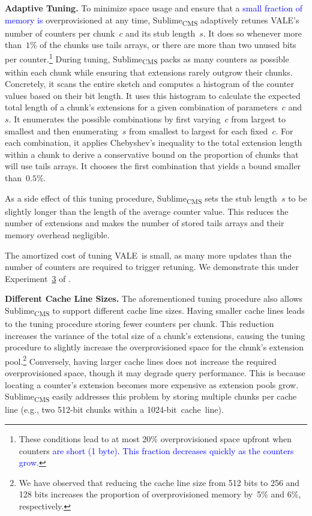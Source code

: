 \documentclass[sigconf]{acmart}
\newcommand{\sketch}{Sublime}
\newcommand{\sketchcms}{\sketch\textsubscript{CMS}\xspace}
\newcommand{\counterencodingabbrv}{VALE}
\begin{document}
\textbf{Adaptive Tuning.}
To minimize space usage and ensure that a \textcolor{blue}{small fraction of
memory is} overprovisioned at any time, \sketchcms adaptively retunes
\counterencodingabbrv's number of counters per chunk~$c$ and its stub
length~$s$. It does so whenever more than~$1\%$ of the chunks use tails arrays,
or there are more than two unused bits per counter.\footnote{These conditions
lead to at most 20\% overprovisioned space upfront when counters
\textcolor{blue}{are short (1 byte). This fraction decreases quickly as the
counters grow.}} During tuning, \sketchcms packs as many counters as possible
within each chunk while ensuring that extensions rarely outgrow their chunks.
Concretely, it scans the entire sketch and computes a histogram of the counter
values based on their bit length. It uses this histogram to calculate the
expected total length of a chunk's extensions for a given combination of
parameters~$c$ and $s$. It enumerates the possible combinations by first
varying~$c$ from largest to smallest and then enumerating~$s$ from smallest to
largest for each fixed~$c$. For each combination, it applies Chebyshev's
inequality to the total extension length within a chunk to derive a
conservative bound on the proportion of chunks that will use tails arrays. It
chooses the first combination that yields a bound smaller than~$0.5\%$. 

As a side effect of this tuning procedure, \sketchcms sets the stub length~$s$
to be slightly longer than the length of the average counter value. This
reduces the number of extensions and makes the number of stored tails arrays
and their memory overhead negligible.

The amortized cost of tuning \counterencodingabbrv\ is small, as many more
updates than the number of counters are required to trigger retuning. We
demonstrate this under Experiment~\hyperlink{experiment:vale_tuning}{3} of
.

\textbf{Different Cache Line Sizes.}
The aforementioned tuning procedure also allows \sketchcms to support different
cache line sizes. Having smaller cache lines leads to the tuning procedure
storing fewer counters per chunk. This reduction increases the variance of the
total size of a chunk's extensions, causing the tuning procedure to slightly
increase the overprovisioned space for the chunk's extension
pool.\footnote{We have observed that reducing the cache line size from 512
bits to 256 and 128 bits increases the proportion of overprovisioned memory
by~5\% and 6\%, respectively.} Conversely, having larger cache lines does not
increase the required overprovisioned space, though it may degrade query
performance. This is because locating a counter's extension becomes more
expensive as extension pools grow. \sketchcms easily addresses this problem by
storing multiple chunks per cache line (e.g., two 512-bit chunks within a
1024{\nobreakdash-}bit~cache~line).
\end{document}
